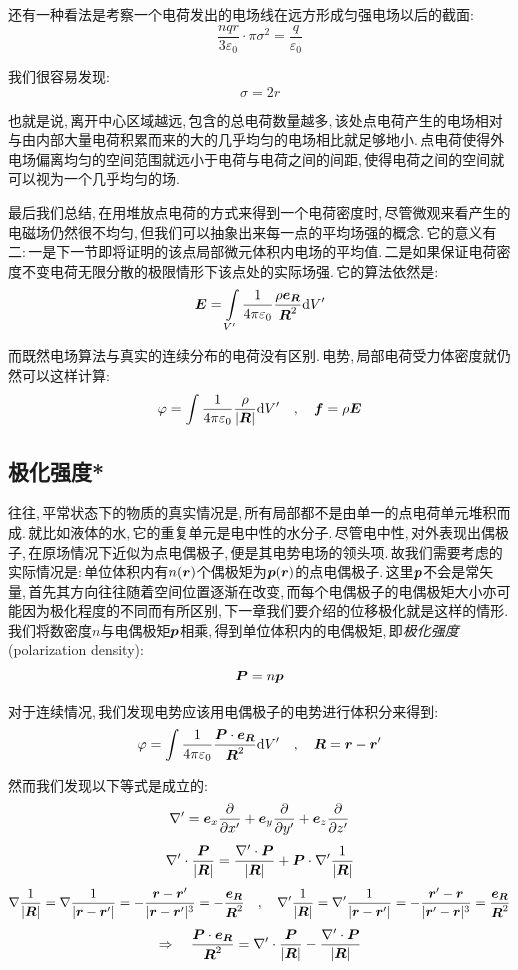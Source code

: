 还有一种看法是考察一个电荷发出的电场线在远方形成匀强电场以后的截面:
\[\frac{nqr}{3\varepsilon_0}\cdot \pi\sigma^2=\frac{q}{\varepsilon_0}\]

我们很容易发现:
\[\sigma=2r\]

也就是说,\,离开中心区域越远,\,包含的总电荷数量越多,\,该处点电荷产生的电场相对与由内部大量电荷积累而来的大的几乎均匀的电场相比就足够地小.\,点电荷使得外电场偏离均匀的空间范围就远小于电荷与电荷之间的间距,\,使得电荷之间的空间就可以视为一个几乎均匀的场.

最后我们总结,\,在用堆放点电荷的方式来得到一个电荷密度时,\,尽管微观来看产生的电磁场仍然很不均匀,\,但我们可以抽象出来每一点的平均场强的概念.\,它的意义有二:\,一是下一节即将证明的该点局部微元体积内电场的平均值.\,二是如果保证电荷密度不变电荷无限分散的极限情形下该点处的实际场强.\,它的算法依然是:
\[\boldsymbol{E}=\int\limits_{V'} \frac{1}{4\pi\varepsilon_0} \frac{\rho \boldsymbol{e}_{\boldsymbol{R}}}{\boldsymbol{R}^2} \textrm{d} V'\]

而既然电场算法与真实的连续分布的电荷没有区别.\,电势,\,局部电荷受力体密度就仍然可以这样计算:
\[\varphi=\int \frac{1}{4\pi\varepsilon_0}\frac{\rho}{|\boldsymbol{R}|}\textrm{d} V'\quad ,\quad \boldsymbol{f}=\rho \boldsymbol{E}\]

\subsection{极化强度*}

往往,\,平常状态下的物质的真实情况是,\,所有局部都不是由单一的点电荷单元堆积而成.\,就比如液体的水,\,它的重复单元是电中性的水分子.\,尽管电中性,\,对外表现出偶极子,\,在原场情况下近似为点电偶极子,\,便是其电势电场的领头项.\,故我们需要考虑的实际情况是:\,单位体积内有$n(\boldsymbol{r})$个偶极矩为$\boldsymbol{p}(\boldsymbol{r})$的点电偶极子.\,这里$\boldsymbol{p}$不会是常矢量,\,首先其方向往往随着空间位置逐渐在改变,\,而每个电偶极子的电偶极矩大小亦可能因为极化程度的不同而有所区别,\,下一章我们要介绍的位移极化就是这样的情形.\,我们将数密度$n$与电偶极矩$\boldsymbol{p}$相乘,\,得到单位体积内的电偶极矩,\,即\emph{极化强度}(polarization density):
\[\boldsymbol{P}=n\boldsymbol{p}\]

对于连续情况,\,我们发现电势应该用电偶极子的电势进行体积分来得到:
\[\varphi=\int \frac{1}{4\pi\varepsilon_0} \frac{\boldsymbol{P}\cdot \boldsymbol{e}_{\boldsymbol{R}}}{\boldsymbol{R}^2}\textrm{d} V' \quad ,\quad \boldsymbol{R}=\boldsymbol{r}-\boldsymbol{r}'\]

然而我们发现以下等式是成立的:
\[\nabla'=\boldsymbol{e}_x\frac{\partial}{\partial x'}+\boldsymbol{e}_y\frac{\partial}{\partial y'}+\boldsymbol{e}_z\frac{\partial}{\partial z'}\]
\[\nabla'\cdot\frac{\boldsymbol{P}}{|\boldsymbol{R}|}=\frac{\nabla'\cdot \boldsymbol{P}}{|\boldsymbol{R}|}+\boldsymbol{P}\cdot\nabla'\frac{1}{|\boldsymbol{R}|}\]
\[\nabla\frac{1}{|\boldsymbol{R}|}=\nabla\frac{1}{|\boldsymbol{r}-\boldsymbol{r}'|}=-\frac{\boldsymbol{r}-\boldsymbol{r}'}{|\boldsymbol{r}-\boldsymbol{r}'|^3}=-\frac{\boldsymbol{e}_{\boldsymbol{R}}}{\boldsymbol{R}^2}\quad,\quad \nabla'\frac{1}{|\boldsymbol{R}|}=\nabla'\frac{1}{|\boldsymbol{r}-\boldsymbol{r}'|}=-\frac{\boldsymbol{r}'-\boldsymbol{r}}{|\boldsymbol{r}'-\boldsymbol{r}|^3}=\frac{\boldsymbol{e}_{\boldsymbol{R}}}{\boldsymbol{R}^2}\]
\[\Rightarrow\quad \frac{\boldsymbol{P}\cdot \boldsymbol{e}_{\boldsymbol{R}}}{\boldsymbol{R}^2}=\nabla'\cdot\frac{\boldsymbol{P}}{|\boldsymbol{R}|}-\frac{\nabla'\cdot \boldsymbol{P}}{|\boldsymbol{R}|}\]

